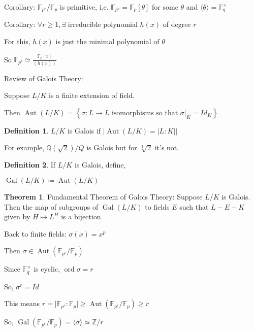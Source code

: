 \documentclass{article}
\theoremstyle{definition}
\newtheorem{definition}{Definition}
\newtheorem{theorem}{Theorem}
\begin{document}
Corollary: \(\mathbb{F} _{p^r}/\mathbb{F} _p\) is primitive, i.e. \(\mathbb{F}_{p^r}=\mathbb{F}_p [\theta]\) for some \(\theta\) and \(\langle \theta \rangle = \mathbb{F}_q^\times \)  

Corollary: \(\forall r \geq 1, \exists \) irreducible polynomial \(h(x)\) of degree \(r\)

For this, \(h(x)\) is just the minimal polynomial of \(\theta\) 

So \(\mathbb{F}_{p^r}\simeq \frac{\mathbb{F}_p[x]}{(h(x))}\) 

Review of Galois Theory:

Suppose \(L/K\) is a finite extension of field.

Then \(\operatorname{Aut}(L/K) = \left\{ \sigma : L \to L \text{ isomorphisms so that }\sigma|_K = Id_K  \right\}  \) 

\begin{definition}
    \(L/K\) is Galois if \(\vert \operatorname{Aut}(L/K)=\vert L : K \vert   \vert \) 
\end{definition}

For example, \(\mathbb{Q}(\sqrt{2})/Q\) is Galois but for \(\sqrt[3]{2} \)  it's not.

\begin{definition}
    If \(L / K\) is Galois, define,

    \(\operatorname{Gal}(L / K) \coloneqq \operatorname{Aut}(L / K) \) 
\end{definition}

\begin{theorem}
    Fundamental Theorem of Galois Theory: Suppose \(L / K\) is Galois. Then the map of subgroups of \(\operatorname{Gal}(L / K)\) to fields \(E\) such that \(L-E-K\) given by \(H \mapsto L^H\) is a bijection.   
\end{theorem}

Back to finite fields: \(\sigma (x)=x^p\)
    
Then \(\sigma \in \operatorname{Aut}(\mathbb{F} _{p^r} / \mathbb{F} _p) \) 
   
Since \(\mathbb{F} _q ^\times \) is cyclic, \(\operatorname{ord} \sigma =r \) 

So, \(\sigma ^r = Id\)
    
This means \(r = \vert \mathbb{F} _{p^r} : \mathbb{F} _p \vert \geq  \operatorname{Aut}(\mathbb{F} _{p^r} / \mathbb{F}_p) \geq r \) 

So, \(\operatorname{Gal}(\mathbb{F} _{p^r} / \mathbb{F} _p) = \langle \sigma  \rangle \simeq \mathbb{Z} / r\) 
\end{document}
